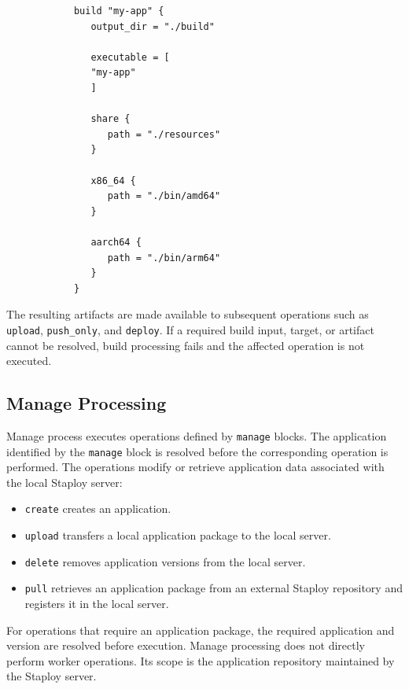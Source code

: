 \documentclass[11pt,a4paper]{article}
\begin{document}
    \begin{center}
        \begin{verbatim}
            build "my-app" {
               output_dir = "./build"

               executable = [
               "my-app"
               ]

               share {
                  path = "./resources"
               }

               x86_64 {
                  path = "./bin/amd64"
               }

               aarch64 {
                  path = "./bin/arm64"
               }
            }
        \end{verbatim}
    \end{center}

    The resulting artifacts are made available to subsequent operations such as \texttt{upload}, \texttt{push\_only}, and \texttt{deploy}.
    If a required build input, target, or artifact cannot be resolved, build processing fails and the affected operation is not executed.

    \subsection{Manage Processing}\label{subsec:manage-processing}

    Manage process executes operations defined by \texttt{manage} blocks.
    The application identified by the \texttt{manage} block is resolved before the corresponding operation is performed.
    The operations modify or retrieve application data associated with the local Staploy server:

    \begin{itemize}
        \item \texttt{create} creates an application.
        \item \texttt{upload} transfers a local application package to the local server.
        \item \texttt{delete} removes application versions from the local server.
        \item \texttt{pull} retrieves an application package from an external Staploy repository and registers it in the local server.
    \end{itemize}

    For operations that require an application package, the required application and version are resolved before execution.
    Manage processing does not directly perform worker operations.
    Its scope is the application repository maintained by the Staploy server.
\end{document}
